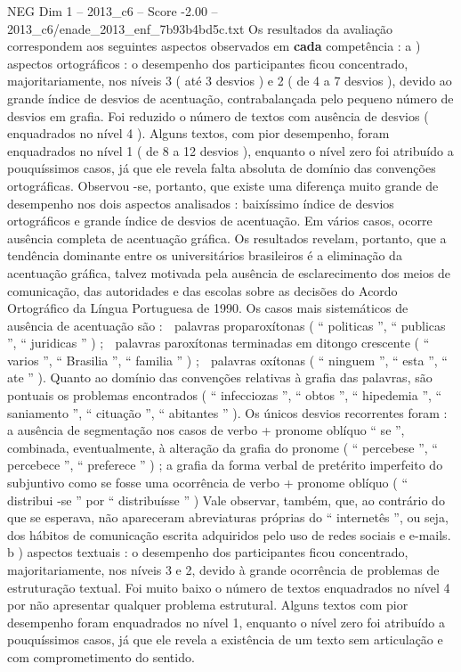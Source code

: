 \begin{textsample}{NEG Dim 1 – 2013\_c6 – Score -2.00 – 2013\_c6/enade\_2013\_enf\_7b93b4bd5c.txt}
Os resultados da avaliação correspondem aos seguintes aspectos observados em \textbf{cada} competência : a ) aspectos ortográficos : o desempenho dos participantes ficou concentrado, majoritariamente, nos níveis 3 ( até 3 desvios ) e 2 ( de 4 a 7 desvios ), devido ao grande índice de desvios de acentuação, contrabalançada pelo pequeno número de desvios em grafia.
Foi reduzido o número de textos com ausência de desvios ( enquadrados no nível 4 ).
Alguns textos, com pior desempenho, foram enquadrados no nível 1 ( de 8 a 12 desvios ), enquanto o nível zero foi atribuído a pouquíssimos casos, já que ele revela falta absoluta de domínio das convenções ortográficas.
Observou -se, portanto, que existe uma diferença muito grande de desempenho nos dois aspectos analisados : baixíssimo índice de desvios ortográficos e grande índice de desvios de acentuação.
Em vários casos, ocorre ausência completa de acentuação gráfica.
Os resultados revelam, portanto, que a tendência dominante entre os universitários brasileiros é a eliminação da acentuação gráfica, talvez motivada pela ausência de esclarecimento dos meios de comunicação, das autoridades e das escolas sobre as decisões do Acordo Ortográfico da Língua Portuguesa de 1990.
Os casos mais sistemáticos de ausência de acentuação são :  palavras proparoxítonas ( “ politicas ”, “ publicas ”, “ juridicas ” ) ;  palavras paroxítonas terminadas em ditongo crescente ( “ varios ”, “ Brasilia ”, “ familia ” ) ;  palavras oxítonas ( “ ninguem ”, “ esta ”, “ ate ” ).
Quanto ao domínio das convenções relativas à grafia das palavras, são pontuais os problemas encontrados ( “ infecciozas ”, “ obtos ”, “ hipedemia ”, “ saniamento ”, “ cituação ”, “ abitantes ” ).
Os únicos desvios recorrentes foram : a ausência de segmentação nos casos de verbo + pronome oblíquo “ se ”, combinada, eventualmente, à alteração da grafia do pronome ( “ percebese ”, “ percebece ”, “ preferece ” ) ; a grafia da forma verbal de pretérito imperfeito do subjuntivo como se fosse uma ocorrência de verbo + pronome oblíquo ( “ distribui -se ” por “ distribuísse ” ) Vale observar, também, que, ao contrário do que se esperava, não apareceram abreviaturas próprias do “ internetês ”, ou seja, dos hábitos de comunicação escrita adquiridos pelo uso de redes sociais e e-mails. b ) aspectos textuais : o desempenho dos participantes ficou concentrado, majoritariamente, nos níveis 3 e 2, devido à grande ocorrência de problemas de estruturação textual.
Foi muito baixo o número de textos enquadrados no nível 4 por não apresentar qualquer problema estrutural.
Alguns textos com pior desempenho foram enquadrados no nível 1, enquanto o nível zero foi atribuído a pouquíssimos casos, já que ele revela a existência de um texto sem articulação e com comprometimento do sentido.

\end{textsample}
